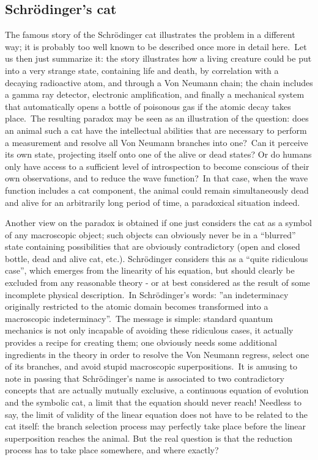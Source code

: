 \documentclass[12pt,onecolumn]{article}%
\begin{document}
\subsection{Schr\"{o}dinger's cat}

\label{cat}

The famous story of the Schr\"{o}dinger cat \cite{SC} \cite{SC2} illustrates
the problem in a different way; it is probably too well known to be described
once more in detail here.\ Let us then just summarize it: the story
illustrates how a living creature could be put into a very strange state,
containing life and death, by correlation with a decaying radioactive atom,
and through a Von Neumann chain; the chain includes a gamma ray detector,
electronic amplification, and finally a mechanical system that automatically
opens a bottle of poisonous gas if the atomic decay takes place.\ The
resulting paradox may be seen as an illustration of the question: does an
animal such a cat have the intellectual abilities that are necessary to
perform a measurement and resolve all Von Neumann branches into one?\ Can it
perceive its own state, projecting itself onto one of the alive or dead
states? Or do humans only have access to a sufficient level of introspection
to become conscious of their own observations, and to reduce the wave
function?\ In that case, when the wave function includes a cat component, the
animal could remain simultaneously dead and alive for an arbitrarily long
period of time, a paradoxical situation indeed.

Another view on the paradox is obtained if one just considers the cat as a
symbol of any macroscopic object; such objects can obviously never be in a
``blurred'' state containing possibilities that are obviously contradictory
(open and closed bottle, dead and alive cat, etc.). Schr\"{o}dinger considers
this as a ``quite ridiculous case'', which emerges from the linearity of his
equation, but should clearly be excluded from any reasonable theory - or at
best considered as the result of some incomplete physical description.\ In
Schr\"{o}dinger's words: ''an indeterminacy originally restricted to the
atomic domain becomes transformed into a macroscopic indeterminacy''.\ The
message is simple: standard quantum mechanics is not only incapable of
avoiding these ridiculous cases, it actually provides a recipe for creating
them; one obviously needs some additional ingredients in the theory in order
to resolve the Von Neumann regress, select one of its branches, and avoid
stupid macroscopic superpositions.\ It is amusing to note in passing that
Schr\"{o}dinger's name is associated to two contradictory concepts that are
actually mutually exclusive, a continuous equation of evolution and the
symbolic cat, a limit that the equation should never reach! Needless to say,
the limit of validity of the linear equation does not have to be related to
the cat itself: the branch selection process may perfectly take place before
the linear superposition reaches the animal. But the real question is that the
reduction process has to take place somewhere, and where exactly?
\end{document}
